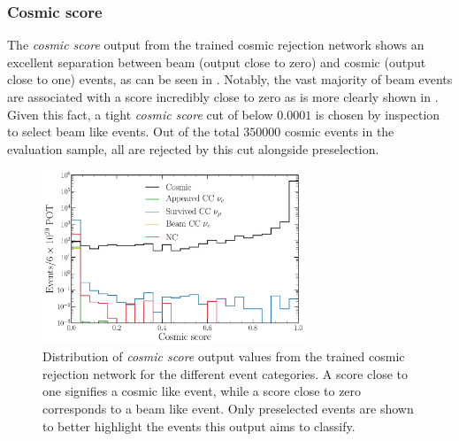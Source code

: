 \subsubsection*{Cosmic score} %

The \emph{cosmic score} output from the trained cosmic rejection network shows an excellent
separation between beam (output close to zero) and cosmic (output close to one) events, as can be
seen in . Notably, the vast majority of beam events are associated
with a score incredibly close to zero as is more clearly shown in
. Given this fact, a tight \emph{cosmic score} cut of below
$0.0001$ is chosen by inspection to select beam like events. Out of the total $350000$ cosmic
events in the evaluation sample, all are rejected by this cut alongside preselection.

\begin{figure} %
    \includegraphics[width=0.7\textwidth]{diagrams/7-results/final_cosmic_outputs.pdf}
    \caption[Distribution of cosmic score output values]
    {Distribution of \emph{cosmic score} output values from the trained cosmic rejection network
        for the different event categories. A score close to one signifies a cosmic like event,
        while a score close to zero corresponds to a beam like event. Only preselected events are
        shown to better highlight the events this output aims to classify.}
    \label{fig:cosmic_outputs}
\end{figure}

